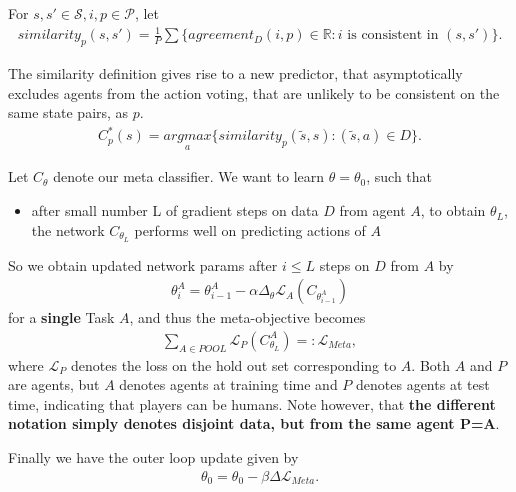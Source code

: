 \documentclass[a4paper, 11pt]{article}
\begin{document}
	
	\begin{Def}[p-similarity] {For $s,s'\in\mathcal{S},i,p\in\mathcal{P}$, let  }
		\begin{align}
			similarity_p(s,s') = \frac{1}{P}\sum \{agreement_D(i,p)\in\mathbb{R}: i \text{ is consistent in } (s,s') \}.
		\end{align}
	\end{Def}
	
	The similarity definition gives rise to a new predictor, that asymptotically excludes agents from the action voting, that are unlikely to be consistent on the same state pairs, as $p$.
	\begin{align*}
	C^*_p(s) = \underset{a}{argmax} \{ similarity_p(\tilde{s}, s): (\tilde{s}, a)\in D \}.
	\end{align*}
	
	
	Let $C_{\theta}$ denote our meta classifier. We want to learn $\theta=\theta_0$, such that
	\begin{itemize}
		\item after small number L of gradient steps on data $D$ from agent $A$, to obtain $\theta_L$, the network $C_{\theta_L}$ performs well on predicting actions of $A$
	\end{itemize}
	So we obtain updated network params after $i\leq L$ steps on $D$ from $A$ by
	\begin{align*}
	\theta^A_i = \theta^A_{i-1} - \alpha \Delta_{\theta} \mathcal{L}_A(C_{\theta^A_{i-1}})
	\end{align*} for a \textbf{single} Task $A$, and thus the meta-objective becomes
	\begin{align*}
	\sum_{A \in POOL} \mathcal{L}_{P}(C^A_{\theta_L}) =: \mathcal{L}_{Meta}, 
	\end{align*} where $\mathcal{L}_{P}$ denotes the loss on the hold out set corresponding to $A$. Both $A$ and $P$ are agents, but $A$ denotes agents at training time and $P$ denotes agents at test time, indicating that players can be humans. Note however, that \textbf{the different notation simply denotes disjoint data, but from the same agent P=A}.
	
	Finally we have the outer loop update given by
	\begin{align*}
	\theta_0 = \theta_0 - \beta \Delta \mathcal{L}_{Meta}.
	\end{align*}
	
\end{document}
